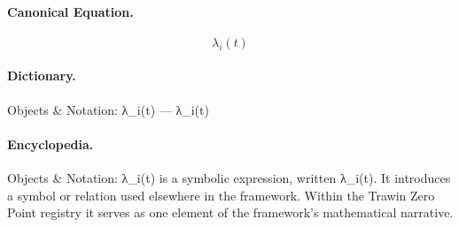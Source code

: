 \paragraph{Canonical Equation.}
\[
\lambda_i(t)
\]

\paragraph{Dictionary.}
Objects \& Notation: λ\_i(t) — λ\_i(t)

\paragraph{Encyclopedia.}
Objects \& Notation: λ\_i(t) is a symbolic expression, written λ\_i(t). It introduces a symbol or relation used elsewhere in the framework. Within the Trawin Zero Point registry it serves as one element of the framework's mathematical narrative.
